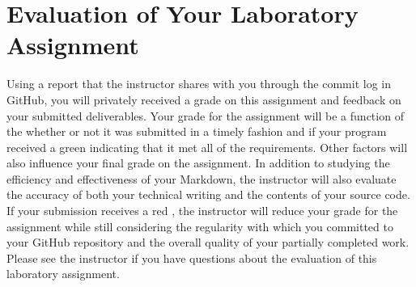 \documentclass[11pt]{article}
\newcommand{\checkmark}{\ding{51}}
\newcommand{\naughtmark}{\ding{55}}
\begin{document}
\vspace*{-.15in}

\section*{Evaluation of Your Laboratory Assignment}

Using a report that the instructor shares with you through the commit log in
GitHub, you will privately received a grade on this assignment and feedback on
your submitted deliverables. Your grade for the assignment will be a function of
the whether or not it was submitted in a timely fashion and if your program
received a green \checkmark{} indicating that it met all of the requirements.
Other factors will also influence your final grade on the assignment. In
addition to studying the efficiency and effectiveness of your Markdown, the
instructor will also evaluate the accuracy of both your technical writing and
the contents of your source code. If your submission receives a red
\naughtmark{}, the instructor will reduce your grade for the assignment while
still considering the regularity with which you committed to your GitHub
repository and the overall quality of your partially completed work. Please see
the instructor if you have questions about the evaluation of this laboratory
assignment.
\end{document}
